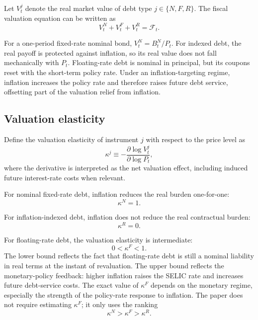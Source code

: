 \documentclass[12pt,a4paper]{article}
\begin{document}
Let \(V_t^j\) denote the real market value of debt type \(j\in\{N,F,R\}\). The fiscal valuation equation can be written as
\begin{equation}
V_t^N+V_t^F+V_t^R=\mathcal{F}_t.
\label{eq:valuation_equation}
\end{equation}

For a one-period fixed-rate nominal bond, \(V_t^N=B_t^N/P_t\). For indexed debt, the real payoff is protected against inflation, so its real value does not fall mechanically with \(P_t\). Floating-rate debt is nominal in principal, but its coupons reset with the short-term policy rate. Under an inflation-targeting regime, inflation increases the policy rate and therefore raises future debt service, offsetting part of the valuation relief from inflation.

\subsection{Valuation elasticity}

Define the valuation elasticity of instrument \(j\) with respect to the price level as
\begin{equation}
\kappa^j
\equiv
-\frac{\partial \log V_t^j}{\partial \log P_t},
\label{eq:kappa_def}
\end{equation}
where the derivative is interpreted as the net valuation effect, including induced future interest-rate costs when relevant.

For nominal fixed-rate debt, inflation reduces the real burden one-for-one:
\begin{equation}
\kappa^N=1.
\end{equation}

For inflation-indexed debt, inflation does not reduce the real contractual burden:
\begin{equation}
\kappa^R=0.
\end{equation}

For floating-rate debt, the valuation elasticity is intermediate:
\begin{equation}
0<\kappa^F<1.
\end{equation}
The lower bound reflects the fact that floating-rate debt is still a nominal liability in real terms at the instant of revaluation. The upper bound reflects the monetary-policy feedback: higher inflation raises the SELIC rate and increases future debt-service costs. The exact value of \(\kappa^F\) depends on the monetary regime, especially the strength of the policy-rate response to inflation. The paper does not require estimating \(\kappa^F\); it only uses the ranking
\begin{equation}
\kappa^N>\kappa^F>\kappa^R.
\label{eq:kappa_ranking}
\end{equation}
\end{document}
